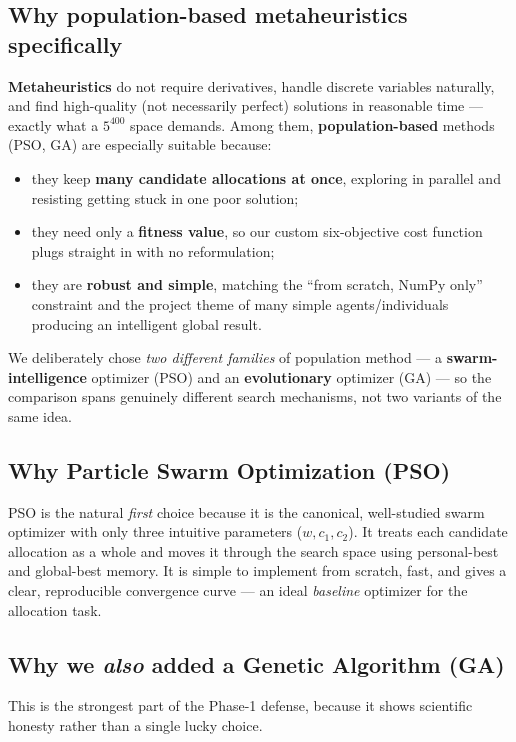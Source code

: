 \documentclass[11pt]{article}
\begin{document}
\subsection{Why population-based metaheuristics specifically}
\begin{rebut}
\textbf{Metaheuristics} do not require derivatives, handle discrete variables
naturally, and find high-quality (not necessarily perfect) solutions in
reasonable time --- exactly what a $5^{400}$ space demands. Among them,
\textbf{population-based} methods (PSO, GA) are especially suitable because:
\begin{itemize}[nosep]
  \item they keep \textbf{many candidate allocations at once}, exploring in
        parallel and resisting getting stuck in one poor solution;
  \item they need only a \textbf{fitness value}, so our custom six-objective cost
        function plugs straight in with no reformulation;
  \item they are \textbf{robust and simple}, matching the ``from scratch, NumPy
        only'' constraint and the project theme of many simple agents/individuals
        producing an intelligent global result.
\end{itemize}
We deliberately chose \emph{two different families} of population method --- a
\textbf{swarm-intelligence} optimizer (PSO) and an \textbf{evolutionary}
optimizer (GA) --- so the comparison spans genuinely different search
mechanisms, not two variants of the same idea.
\end{rebut}

\subsection{Why Particle Swarm Optimization (PSO)}
\begin{rebut}
PSO is the natural \emph{first} choice because it is the canonical, well-studied
swarm optimizer with only three intuitive parameters ($w, c_1, c_2$). It treats
each candidate allocation as a whole and moves it through the search space using
personal-best and global-best memory. It is simple to implement from scratch,
fast, and gives a clear, reproducible convergence curve --- an ideal
\emph{baseline} optimizer for the allocation task.
\end{rebut}

\subsection{Why we \emph{also} added a Genetic Algorithm (GA)}
This is the strongest part of the Phase-1 defense, because it shows scientific
honesty rather than a single lucky choice.
\end{document}
